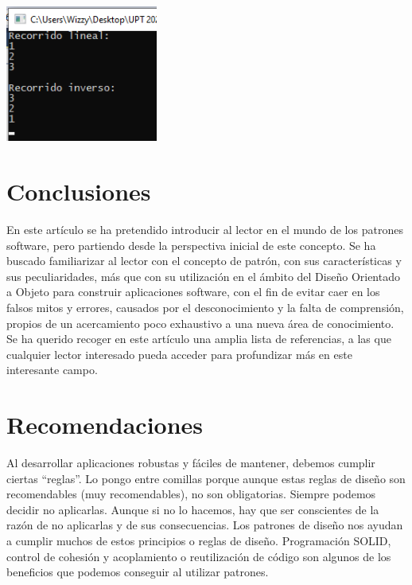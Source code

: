\documentclass[twoside,twocolumn]{article}
\begin{document}
    \begin{center}
        \includegraphics[width=5cm]{./img/Iterator5.png} 
    \end{center}
\section{Conclusiones}
\begin{itemize}
    En este artículo se ha pretendido introducir al lector en el mundo de los patrones software, pero partiendo desde la perspectiva inicial de este concepto.
    Se ha buscado familiarizar al lector con el concepto de patrón, con sus características y sus peculiaridades, más que con su utilización en el ámbito del Diseño Orientado a Objeto para construir aplicaciones software, con el fin de evitar caer en los falsos mitos y errores, causados por el desconocimiento y la falta de comprensión, propios de un acercamiento poco exhaustivo a una nueva área de conocimiento. 
    Se ha querido recoger en este artículo una amplia lista de referencias, a las que cualquier lector interesado pueda acceder para profundizar más en este interesante campo.
\end{itemize}


\section{Recomendaciones}
\begin{itemize}
	Al desarrollar aplicaciones robustas y fáciles de mantener, debemos cumplir ciertas “reglas”. Lo pongo entre comillas porque aunque estas reglas de diseño son recomendables (muy recomendables), no son obligatorias. Siempre podemos decidir no aplicarlas. Aunque si no lo hacemos, hay que ser conscientes de la razón de no aplicarlas y de sus consecuencias.
Los patrones de diseño nos ayudan a cumplir muchos de estos principios o reglas de diseño. Programación SOLID, control de cohesión y acoplamiento o reutilización de código son algunos de los beneficios que podemos conseguir al utilizar patrones.

\end{itemize}
\end{document}
